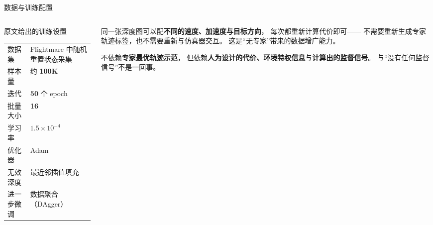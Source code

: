 \begin{frame}{数据与训练配置}
  \small
  \begin{columns}[t]
    \begin{column}{0.5\textwidth}
      \begin{block}{原文给出的训练设置}
        \footnotesize
        \begin{tabular}{@{}ll@{}}
          \toprule
          数据集 & Flightmare 中随机重置状态采集 \\
          样本量 & 约 \textbf{100K} \\
          迭代 & \textbf{50} 个 epoch \\
          批量大小 & \textbf{16} \\
          学习率 & $1.5\times10^{-4}$ \\
          优化器 & Adam \\
          无效深度 & 最近邻插值填充 \\
          进一步微调 & 数据聚合（DAgger）\\
          \bottomrule
        \end{tabular}
      \end{block}
    \end{column}
    \begin{column}{0.46\textwidth}
      \begin{paperfinding}[无需重新标注的原因]
        \small
        同一张深度图可以配\textbf{不同的速度、加速度与目标方向}，
        每次都重新计算代价即可——
        不需要重新生成专家轨迹标签，也不需要重新与仿真器交互。
        这是“无专家”带来的数据增广能力。
      \end{paperfinding}
      \begin{reading}
        \scriptsize
        不依赖\textbf{专家最优轨迹示范}，
        但依赖\textbf{人为设计的代价、环境特权信息}与\textbf{计算出的监督信号}。
        与“没有任何监督信号”不是一回事。
      \end{reading}
    \end{column}
  \end{columns}
\end{frame}

